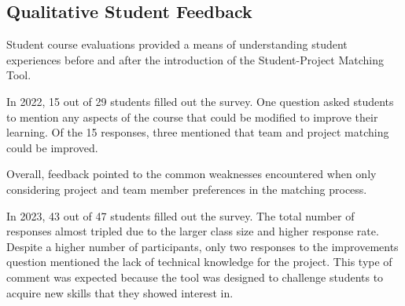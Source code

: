 \subsection{Qualitative Student Feedback}
Student course evaluations provided a means of understanding student experiences before and after the introduction of the Student-Project Matching Tool. 

In 2022, 15 out of 29 students filled out the survey. One question asked students to mention any aspects of the course that could be modified to improve their learning. Of the 15 responses, three mentioned that team and project matching could be improved. 

Overall, feedback pointed to the common weaknesses encountered when only considering project and team member preferences in the matching process.

In 2023, 43 out of 47 students filled out the survey. The total number of responses almost tripled due to the larger class size and higher response rate. Despite a higher number of participants, only two responses to the improvements question mentioned the lack of technical knowledge for the project. This type of comment was expected because the tool was designed to challenge students to acquire new skills that they showed interest in.





